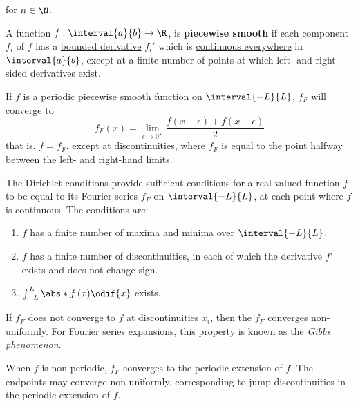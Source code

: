 \documentclass{article}
\begin{document}
for \(n \in \N\).
\begin{definition}
    A function \(f : \interval{a}{b} \to \R\), is \textbf{piecewise smooth} if each component \(f_i\) of \(f\) has a \underline{bounded derivative} \(f_i'\) which is \underline{continuous everywhere} in \(\interval{a}{b}\), except at
    a finite number of points at which left- and right-sided derivatives exist.
\end{definition}
\begin{theorem}
    If \(f\) is a periodic piecewise smooth function on \(\interval{-L}{L}\), \(f_F\) will converge to
    \begin{equation*}
        f_F\left( x \right) = \lim_{\epsilon \to 0^{+}} \frac{f\left( x + \epsilon \right) + f\left( x - \epsilon \right)}{2}
    \end{equation*}
    that is, \(f = f_F\), except at discontinuities, where \(f_F\) is equal to the point halfway between the left- and right-hand limits.
\end{theorem}
\begin{corollary}
    The Dirichlet conditions provide sufficient conditions for a real-valued function \(f\) to be
    equal to its Fourier series \(f_F\) on \(\interval{-L}{L}\), at each point where \(f\) is continuous.
    The conditions are:
    \begin{enumerate}
        \item \(f\) has a finite number of maxima and minima over \(\interval{-L}{L}\).
        \item \(f\) has a finite number of discontinuities, in each of which the derivative \(f'\) exists and does not change sign.
        \item \(\int_{-L}^L \abs*{f\left( x \right)} \odif{x}\) exists.
    \end{enumerate}
\end{corollary}
\begin{definition}
    If \(f_F\) does not converge to \(f\) at discontinuities \(x_i\), then the \(f_F\) converges
    non-uniformly. For Fourier series expansions, this property is known as the \textit{Gibbs phenomenon}.
\end{definition}
\begin{note}
    When \(f\) is non-periodic, \(f_F\) converges to the periodic extension of \(f\).
    The endpoints may converge non-uniformly, corresponding to jump discontinuities in the periodic extension of \(f\).
\end{note}
\end{document}
